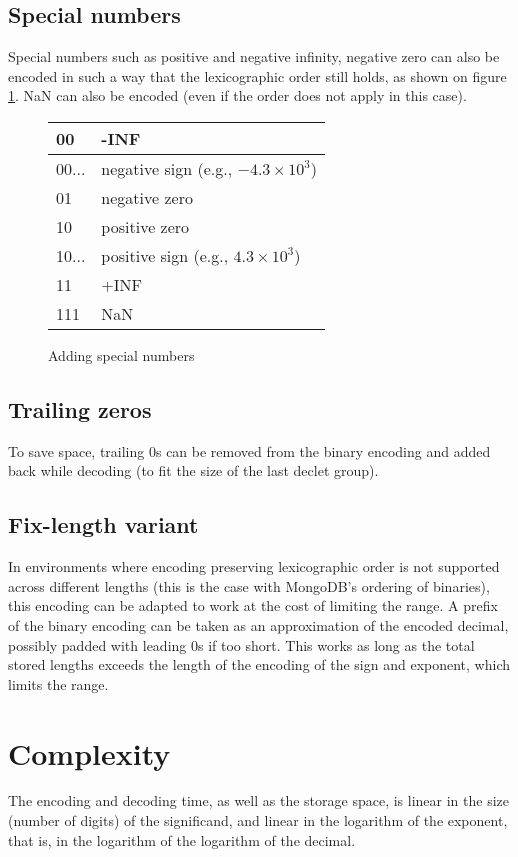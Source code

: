 \documentclass{acm_proc_article-sp}
\begin{document}
\subsection{Special numbers}

Special numbers such as positive and negative infinity, negative zero can also be encoded in such a way that the lexicographic order still holds, as shown on figure \ref{figure-sign-extended}. NaN can also be encoded (even if the order does not apply in this case).

\begin{figure}
\caption{Adding special numbers}
\label{figure-sign-extended}
\center
\begin{tabular}{|l|l|}
\hline
00 & -INF \\
\hline
00... &  negative sign (e.g., $-4.3\times10^3$)\\
\hline
01 & negative zero \\
\hline
10 & positive zero \\
\hline
10... & positive sign (e.g., $4.3\times10^3$)\\
\hline
11 & +INF \\
\hline
111 & NaN \\
\hline
\end{tabular}
\end{figure}

\subsection{Trailing zeros}

To save space, trailing 0s can be removed from the binary encoding and added back while decoding (to fit the size of the last declet group).

\subsection{Fix-length variant}

In environments where encoding preserving lexicographic order is not supported across different lengths (this is the case with MongoDB's ordering of binaries), this encoding can be adapted to work at the cost of limiting the range.
A prefix of the binary encoding can be taken as an approximation of the encoded decimal, possibly padded with leading 0s if too short. This works as long as the total stored lengths exceeds the length of the encoding of the sign and exponent, which limits the range.

\section{Complexity}
\label{section-complexity}
The encoding and decoding time, as well as the storage space, is linear in the size (number of digits) of the significand, and linear in the logarithm of the exponent, that is, in the logarithm of the logarithm of the decimal.
\end{document}
